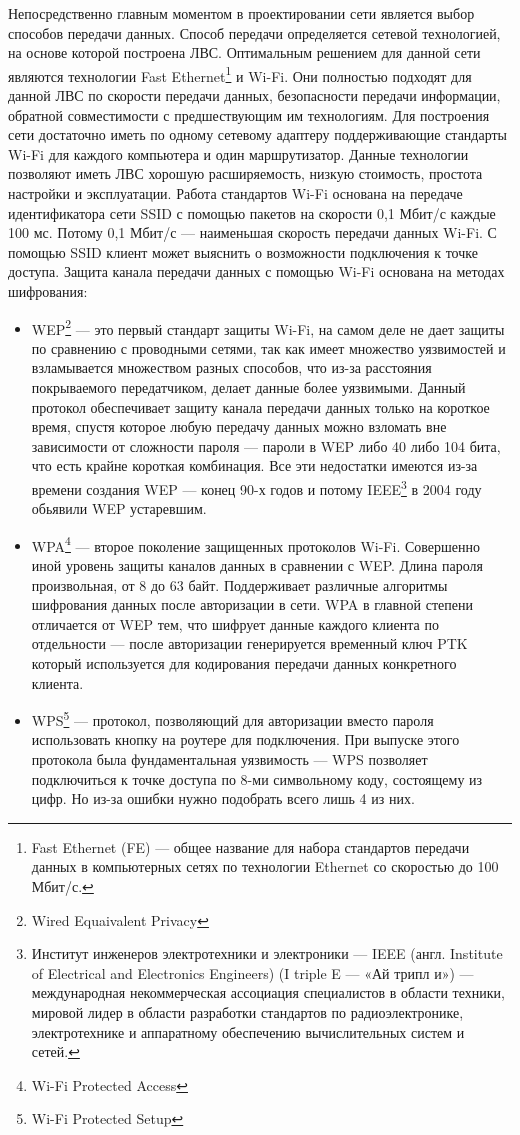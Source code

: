 \documentclass[russian,utf8,pointsection,simple,14pt]{eskdtext}
\begin{document}
\medskip
Непосредственно главным моментом в проектировании сети является выбор способов передачи данных. Способ передачи определяется сетевой технологией, на основе которой построена ЛВС. Оптимальным решением для данной сети являются технологии Fast Ethernet\footnote{Fast Ethernet (FE) — общее название для набора стандартов передачи данных в компьютерных сетях по технологии Ethernet со скоростью до 100 Мбит/с.} и Wi-Fi. Они полностью подходят для данной ЛВС по скорости передачи данных, безопасности передачи информации, обратной совместимости с предшествующим им технологиям. Для построения сети достаточно иметь по одному сетевому адаптеру поддерживающие стандарты Wi-Fi для каждого компьютера и один маршрутизатор. Данные технологии позволяют иметь ЛВС хорошую расширяемость, низкую стоимость, простота настройки и эксплуатации. Работа стандартов Wi-Fi основана на передаче идентификатора сети SSID с помощью пакетов на скорости 0,1 Мбит/с каждые 100 мс. Потому 0,1 Мбит/с --- наименьшая скорость передачи данных Wi-Fi. С помощью SSID клиент может выяснить о возможности подключения к точке доступа.
Защита канала передачи данных с помощью Wi-Fi основана на методах шифрования:
\begin{itemize}
\item WEP\footnote{Wired Equaivalent Privacy} --- это первый стандарт защиты Wi-Fi, на самом деле не дает защиты по сравнению с проводными сетями, так как имеет множество уязвимостей и взламывается множеством разных способов, что из-за расстояния покрываемого передатчиком, делает данные более уязвимыми. Данный протокол обеспечивает защиту канала передачи данных только на короткое время, спустя которое любую передачу данных можно взломать вне зависимости от сложности пароля --- пароли в WEP либо 40 либо 104 бита, что есть крайне короткая комбинация. Все эти недостатки имеются из-за времени создания WEP --- конец 90-х годов и потому IEEE\footnote{Институт инженеров электротехники и электроники — IEEE (англ. Institute of Electrical and Electronics Engineers) (I triple E — «Ай трипл и») — международная некоммерческая ассоциация специалистов в области техники, мировой лидер в области разработки стандартов по радиоэлектронике, электротехнике и аппаратному обеспечению вычислительных систем и сетей.} в 2004 году обьявили WEP устаревшим.
\item WPA\footnote{Wi-Fi Protected Access}  --- второе поколение защищенных протоколов Wi-Fi. Совершенно иной уровень защиты каналов данных в сравнении с WEP. Длина пароля произвольная, от 8 до 63 байт. Поддерживает различные алгоритмы шифрования данных после авторизации в сети. WPA в главной степени отличается от WEP тем, что шифрует данные каждого клиента по отдельности --- после авторизации генерируется временный ключ PTK который используется для кодирования передачи данных конкретного клиента.
\item WPS\footnote{Wi-Fi Protected Setup} --- протокол, позволяющий для авторизации вместо пароля использовать кнопку на роутере для подключения. При выпуске этого протокола была фундаментальная уязвимость --- WPS позволяет подключиться к точке доступа по 8-ми символьному коду, состоящему из цифр. Но из-за ошибки нужно подобрать всего лишь 4 из них.
\end{itemize}
\end{document}
